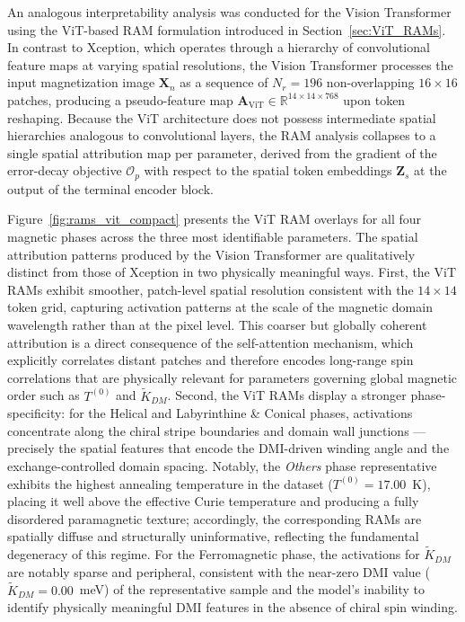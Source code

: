 \documentclass[a4paper,fleqn]{cas-sc}
\begin{document}

An analogous interpretability analysis was conducted for
the Vision Transformer using the ViT-based RAM formulation
introduced in Section~\ref{sec:ViT_RAMs}. In contrast
to Xception, which operates through a hierarchy of
convolutional feature maps at varying spatial resolutions,
the Vision Transformer processes the input magnetization
image $\mathbf{X}_n$ as a sequence of $N_r = 196$
non-overlapping $16\times16$ patches, producing a
pseudo-feature map $\mathbf{A}_{\text{ViT}} \in
\mathbb{R}^{14\times14\times768}$ upon token reshaping.
Because the ViT architecture does not possess intermediate
spatial hierarchies analogous to convolutional layers, the
RAM analysis collapses to a single spatial attribution map
per parameter, derived from the gradient of the
error-decay objective $\mathcal{O}_p$ with respect to the
spatial token embeddings $\mathbf{Z}_s$ at the output of
the terminal encoder block.

Figure~\ref{fig:rams_vit_compact} presents the ViT RAM
overlays for all four magnetic phases across the three
most identifiable parameters. The spatial attribution
patterns produced by the Vision Transformer are
qualitatively distinct from those of Xception in two
physically meaningful ways. First, the ViT RAMs exhibit
smoother, patch-level spatial resolution consistent with
the $14\times14$ token grid, capturing activation patterns
at the scale of the magnetic domain wavelength rather
than at the pixel level. This coarser but globally
coherent attribution is a direct consequence of the
self-attention mechanism, which explicitly correlates
distant patches and therefore encodes long-range spin
correlations that are physically relevant for parameters
governing global magnetic order such as $T^{(0)}$ and
$\tilde{K}_{DM}$. Second, the ViT RAMs display a
stronger phase-specificity: for the Helical and
Labyrinthine \& Conical phases, activations concentrate
along the chiral stripe boundaries and domain wall
junctions --- precisely the spatial features that encode
the DMI-driven winding angle and the exchange-controlled
domain spacing. Notably, the \textit{Others} phase
representative exhibits the highest annealing temperature
in the dataset ($T^{(0)} = 17.00$~K), placing it well
above the effective Curie temperature and producing a
fully disordered paramagnetic texture; accordingly, the
corresponding RAMs are spatially diffuse and structurally
uninformative, reflecting the fundamental degeneracy of
this regime. For the Ferromagnetic phase, the activations
for $\tilde{K}_{DM}$ are notably sparse and peripheral,
consistent with the near-zero DMI value ($\tilde{K}_{DM}
= 0.00$~meV) of the representative sample and the
model's inability to identify physically meaningful DMI
features in the absence of chiral spin winding.
\end{document}

